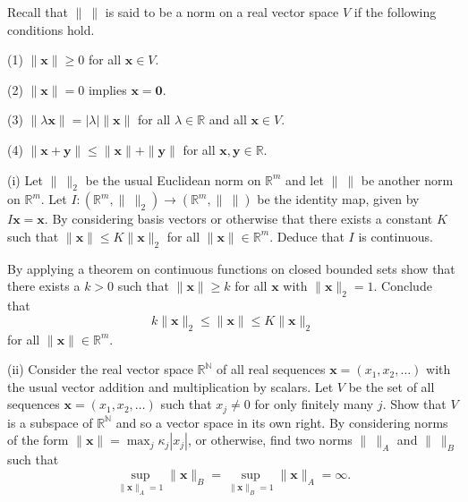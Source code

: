 \begin{question}
Recall that $\|\ \|$ is said to be a norm
on a real vector space $V$ if the following conditions
hold.

(1) $\|\mathbf{x}\|\geq 0$ for all $\mathbf{x}\in V$.

(2) $\|\mathbf{x}\|=0$ implies $\mathbf{x}=\mathbf{0}$.
     
(3) $\|\lambda\mathbf{x}\|=|\lambda|\|\mathbf{x}\|$
for all $\lambda\in{\mathbb R}$ and all $\mathbf{x}\in V$.

(4) $\|\mathbf{x}+\mathbf{y}\|\leq \|\mathbf{x}\|+
\|\mathbf{y}\|$ for all $\mathbf{x},\mathbf{y}\in{\mathbb R}$.

(i) Let $\|\ \|_{2}$ be the usual Euclidean norm
on ${\mathbb R}^{m}$ and let $\|\ \|$ be another
norm on ${\mathbb R}^{m}$. Let 
$I:({\mathbb R}^{m},\|\ \|_{2})\rightarrow ({\mathbb R}^{m},\|\ \|)$
be the identity map, given by $I\mathbf{x}=\mathbf{x}$.
By considering basis vectors or 
otherwise that there exists a constant $K$ 
such that $\|\mathbf{x}\|\leq K\|\mathbf{x}\|_{2}$
for all $\|\mathbf{x}\|\in {\mathbb R}^{m}$. Deduce
that $I$ is continuous. 

By applying a theorem on continuous functions on closed
bounded sets show that there exists a $k>0$ such that
$\|\mathbf{x}\|\geq k$ for all $\mathbf{x}$ with
$\|\mathbf{x}\|_{2}=1$. Conclude that  
\[k\|\mathbf{x}\|_{2}\leq
\|\mathbf{x}\|\leq K\|\mathbf{x}\|_{2}\]
for all $\|\mathbf{x}\|\in {\mathbb R}^{m}$.



(ii) Consider the real vector space $\mathbb{R}^{\mathbb{N}}$
of all real sequences $\mathbf{x}=(x_{1},x_{2},\dots)$
with the usual vector addition and multiplication
by scalars.
Let $V$ be the set of all sequences 
$\mathbf{x}=(x_{1},x_{2},\dots)$ such that $x_{j}\neq 0$ for
only finitely many $j$. Show that $V$ is a subspace of
$\mathbb{R}^{\mathbb{N}}$ and so a vector space in its own right.
By considering norms of the form 
$\|\mathbf{x}\|=\max_{j}\kappa_{j}|x_{j}|$, or otherwise,
find two norms $\|\ \|_{A}$ and $\|\ \|_{B}$ such that
\[\sup_{\|\mathbf{x}\|_{A}=1}\|\mathbf{x}\|_{B}
=\sup_{\|\mathbf{x}\|_{B}=1}\|\mathbf{x}\|_{A}=\infty.\]

\end{question}
